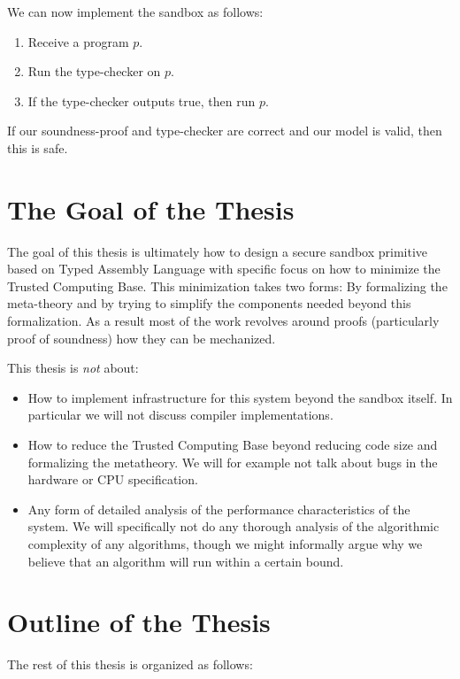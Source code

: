 We can now implement the sandbox as follows:

\begin{enumerate}
\item Receive a program $p$.
\item Run the type-checker on $p$.
\item If the type-checker outputs true, then run $p$.
\end{enumerate}

If our soundness-proof and type-checker are correct and our model is valid, then
this is safe.

\section{The Goal of the Thesis}
\label{sec:goal}

The goal of this thesis is ultimately how to design a secure sandbox primitive
based on Typed Assembly Language with specific focus on how to minimize the
Trusted Computing Base. This minimization takes two forms: By formalizing the
meta-theory and by trying to simplify the components needed beyond this
formalization. As a result most of the work revolves around proofs (particularly
proof of soundness) how they can be mechanized.

This thesis is \emph{not} about:

\begin{itemize}
\item How to implement infrastructure for this system beyond the sandbox
  itself. In particular we will not discuss compiler implementations.
\item How to reduce the Trusted Computing Base beyond reducing code size and
  formalizing the metatheory. We will for example not talk about bugs in the
  hardware or CPU specification.
\item Any form of detailed analysis of the performance characteristics of the
  system.  We will specifically not do any thorough analysis of the algorithmic
  complexity of any algorithms, though we might informally argue why we believe
  that an algorithm will run within a certain bound.
\end{itemize}

\section{Outline of the Thesis}

The rest of this thesis is organized as follows:

